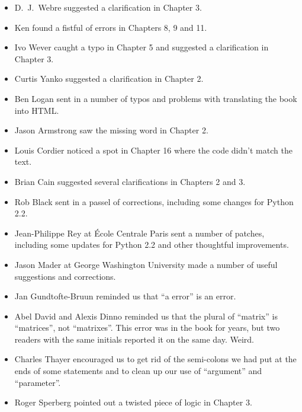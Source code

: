 \documentclass[10pt]{book}
\begin{document}
\begin{itemize}
\item D.~J.~Webre suggested a clarification in Chapter 3.

\item Ken found a fistful of errors in Chapters 8, 9 and 11.

\item Ivo Wever caught a typo in Chapter 5 and suggested a clarification
in Chapter 3.

\item Curtis Yanko suggested a clarification in Chapter 2.

\item Ben Logan sent in a number of typos and problems with translating
the book into HTML.

\item Jason Armstrong saw the missing word in Chapter 2.

\item Louis Cordier noticed a spot in Chapter 16 where the code
didn't match the text.

\item Brian Cain suggested several clarifications in Chapters 2 and 3.

\item Rob Black sent in a passel of corrections, including some
changes for Python 2.2.

\item Jean-Philippe Rey at \'{E}cole Centrale
Paris sent a number of patches, including some updates for Python 2.2
and other thoughtful improvements.

\item Jason Mader at George Washington University made a number
of useful suggestions and corrections.

\item Jan Gundtofte-Bruun reminded us that ``a error'' is an error.

\item Abel David and Alexis Dinno reminded us that the plural of
``matrix'' is ``matrices'', not ``matrixes''.  This error was in the
book for years, but two readers with the same initials reported it on
the same day.  Weird.

\item Charles Thayer encouraged us to get rid of the semi-colons
we had put at the ends of some statements and to clean up our
use of ``argument'' and ``parameter''.

\item Roger Sperberg pointed out a twisted piece of logic in Chapter 3.


\end{itemize}
\end{document}
